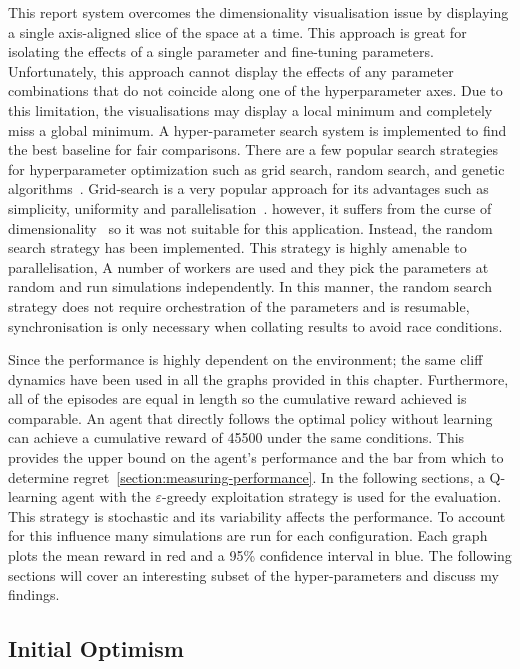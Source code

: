 \documentclass[]{final_report}
\begin{document}
This report system overcomes the dimensionality visualisation issue by displaying a single axis-aligned slice of the space at a time. This approach is great for isolating the effects of a single parameter and fine-tuning parameters. Unfortunately, this approach cannot display the effects of any parameter combinations that do not coincide along one of the hyperparameter axes. Due to this limitation, the visualisations may display a local minimum and completely miss a global minimum. 
\newpage
A hyper-parameter search system is implemented to find the best baseline for fair comparisons. There are a few popular search strategies for hyperparameter optimization such as grid search, random search, and genetic algorithms~\cite{searchStrategies}. Grid-search is a very popular approach for its advantages such as simplicity, uniformity and parallelisation~\cite{searchStrategies}. however, it suffers from the curse of dimensionality~\cite{searchStrategies} so it was not suitable for this application. Instead, the random search strategy has been implemented. This strategy is highly amenable to parallelisation, A number of workers are used and they pick the parameters at random and run simulations independently. In this manner, the random search strategy does not require orchestration of the parameters and is resumable, synchronisation is only necessary when collating results to avoid race conditions.


Since the performance is highly dependent on the environment; the same cliff dynamics have been used in all the graphs provided in this chapter. Furthermore, all of the episodes are equal in length so the cumulative reward achieved is comparable. An agent that directly follows the optimal policy without learning can achieve a cumulative reward of 45500 under the same conditions. This provides the upper bound on the agent's performance and the bar from which to determine regret~\ref{section:measuring-performance}. In the following sections, a Q-learning agent with the $\varepsilon$-greedy exploitation strategy is used for the evaluation. This strategy is stochastic and its variability affects the performance. To account for this influence many simulations are run for each configuration. Each graph plots the mean reward in red and a 95\% confidence interval in blue. The following sections will cover an interesting subset of the hyper-parameters and discuss my findings.


\subsection{Initial Optimism}
\end{document}
